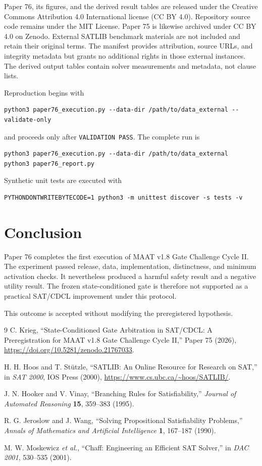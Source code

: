 \documentclass[11pt,a4paper]{article}
\begin{document}
Paper 76, its figures, and the derived result tables are released under the
Creative Commons Attribution 4.0 International license (CC BY 4.0).  Repository
source code remains under the MIT License.  Paper 75 is likewise archived under
CC BY 4.0 on Zenodo.  External SATLIB benchmark materials are not included and
retain their original terms.  The manifest provides attribution, source URLs,
and integrity metadata but grants no additional rights in those external
instances.  The derived output tables contain solver measurements and metadata,
not clause lists.

Reproduction begins with
\begin{verbatim}
python3 paper76_execution.py --data-dir /path/to/data_external --validate-only
\end{verbatim}
and proceeds only after \texttt{VALIDATION PASS}.  The complete run is
\begin{verbatim}
python3 paper76_execution.py --data-dir /path/to/data_external
python3 paper76_report.py
\end{verbatim}
Synthetic unit tests are executed with
\begin{verbatim}
PYTHONDONTWRITEBYTECODE=1 python3 -m unittest discover -s tests -v
\end{verbatim}

\section{Conclusion}

Paper 76 completes the first execution of MAAT v1.8 Gate Challenge Cycle II.
The experiment passed release, data, implementation, distinctness, and minimum
activation checks.  It nevertheless produced a harmful safety result and a
negative utility result.  The frozen state-conditioned gate is therefore not
supported as a practical SAT/CDCL improvement under this protocol.

This outcome is accepted without modifying the preregistered hypothesis.

\begin{thebibliography}{9}
C. Krieg, ``State-Conditioned Gate Arbitration in SAT/CDCL: A
Preregistration for MAAT v1.8 Gate Challenge Cycle II,'' Paper 75 (2026),
\url{https://doi.org/10.5281/zenodo.21767033}.

H. H. Hoos and T. St\"utzle, ``SATLIB: An Online Resource for Research on
SAT,'' in \emph{SAT 2000}, IOS Press (2000),
\url{https://www.cs.ubc.ca/~hoos/SATLIB/}.

J. N. Hooker and V. Vinay, ``Branching Rules for Satisfiability,''
\emph{Journal of Automated Reasoning} \textbf{15}, 359--383 (1995).

R. G. Jeroslow and J. Wang, ``Solving Propositional Satisfiability Problems,''
\emph{Annals of Mathematics and Artificial Intelligence} \textbf{1},
167--187 (1990).

M. W. Moskewicz \emph{et al.}, ``Chaff: Engineering an Efficient SAT Solver,''
in \emph{DAC 2001}, 530--535 (2001).
\end{thebibliography}
\end{document}
